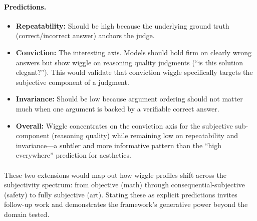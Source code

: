 \paragraph{Predictions.}
\begin{itemize}
    \item \textbf{Repeatability:} Should be high because the underlying ground truth (correct/incorrect answer) anchors the judge.
    \item \textbf{Conviction:} The interesting axis. Models should hold firm on clearly wrong answers but show wiggle on reasoning quality judgments (``is this solution elegant?''). This would validate that conviction wiggle specifically targets the subjective component of a judgment.
    \item \textbf{Invariance:} Should be low because argument ordering should not matter much when one argument is backed by a verifiable correct answer.
    \item \textbf{Overall:} Wiggle concentrates on the conviction axis for the subjective sub-component (reasoning quality) while remaining low on repeatability and invariance---a subtler and more informative pattern than the ``high everywhere'' prediction for aesthetics.
\end{itemize}

\paragraph{} These two extensions would map out how wiggle profiles shift across the subjectivity spectrum: from objective (math) through consequential-subjective (safety) to fully subjective (art). Stating these as explicit predictions invites follow-up work and demonstrates the framework's generative power beyond the domain tested.